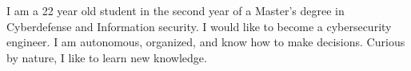 
\begin{cvparagraph}
I am a 22 year old student in the second year of a Master's degree in Cyberdefense and Information security. 
I would like to become a cybersecurity engineer. I am autonomous, organized, and know how to make decisions. Curious by nature, I like to learn new knowledge.
\end{cvparagraph}
